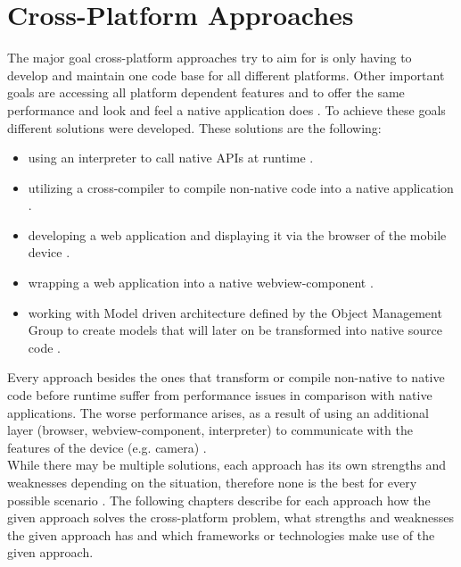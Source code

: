 \documentclass[Bachelor,BIF,english]{twbook}
\begin{document}
\section{Cross-Platform Approaches}
The major goal cross-platform approaches try to aim for is only having to develop and maintain one code base for all different platforms. Other important goals are accessing all platform dependent features and to offer the same performance and look and feel a native application does \cite[p.~1]{7479278} \cite[p.~1]{7934674}. To achieve these goals different solutions were developed. These solutions are the following: 
\begin{itemize}
\item using an interpreter to call native APIs at runtime \cite[p.~3]{7479278} \cite[p.~4-5]{LinckArne2016} \cite[p.~5-6]{Hansson_Vidhall_2016}.
\item utilizing a cross-compiler to compile non-native code into a native application \cite[p.~3-4]{7479278} \cite[p.~5]{Hansson_Vidhall_2016}.
\item developing a web application and displaying it via the browser of the mobile device \cite[p.~2]{7479278} \cite[p.~2-3]{LinckArne2016} \cite[p.~4-5]{Hansson_Vidhall_2016}.
\item wrapping a web application into a native webview-component \cite[p.~2-3]{7479278} \cite[p.~3-4]{LinckArne2016} \cite[p.~5]{Hansson_Vidhall_2016}.
\item working with Model driven architecture defined by the Object Management Group to create models that will later on be transformed into native source code \cite[p.~4]{7479278} \cite[p.~3]{7934674}.
\end{itemize}
Every approach besides the ones that transform or compile non-native to native code before runtime suffer from performance issues in comparison with native applications. The worse performance arises, as a result of using an additional layer (browser, webview-component, interpreter) to communicate with the features of the device (e.g. camera) \cite[p.~2,~10]{JohanssonSderberg2018} \cite[p.~5-6]{LinckArne2016} \cite[p.~111]{Keist2016}.
\\[\baselineskip]
While there may be multiple solutions, each approach has its own strengths and weaknesses depending on the situation, therefore none is the best for every possible scenario \cite[p.~110]{Keist2016}. The following chapters describe for each approach how the given approach solves the cross-platform problem, what strengths and weaknesses the given approach has and which frameworks or technologies make use of the given approach.
\end{document}
